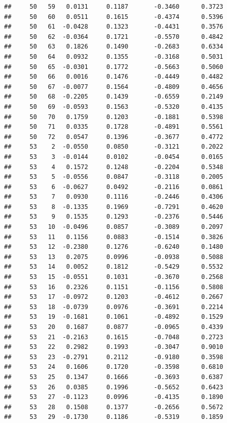 \documentclass[
]{article}
\begin{document}
\begin{verbatim}
##     50   59   0.0131     0.1187       -0.3460      0.3723  
##     50   60   0.0511     0.1615       -0.4374      0.5396  
##     50   61  -0.0428     0.1323       -0.4431      0.3576  
##     50   62  -0.0364     0.1721       -0.5570      0.4842  
##     50   63   0.1826     0.1490       -0.2683      0.6334  
##     50   64   0.0932     0.1355       -0.3168      0.5031  
##     50   65  -0.0301     0.1772       -0.5663      0.5060  
##     50   66   0.0016     0.1476       -0.4449      0.4482  
##     50   67  -0.0077     0.1564       -0.4809      0.4656  
##     50   68  -0.2205     0.1439       -0.6559      0.2149  
##     50   69  -0.0593     0.1563       -0.5320      0.4135  
##     50   70   0.1759     0.1203       -0.1881      0.5398  
##     50   71   0.0335     0.1728       -0.4891      0.5561  
##     50   72   0.0547     0.1396       -0.3677      0.4772  
##     53    2  -0.0550     0.0850       -0.3121      0.2022  
##     53    3  -0.0144     0.0102       -0.0454      0.0165  
##     53    4   0.1572     0.1248       -0.2204      0.5348  
##     53    5  -0.0556     0.0847       -0.3118      0.2005  
##     53    6  -0.0627     0.0492       -0.2116      0.0861  
##     53    7   0.0930     0.1116       -0.2446      0.4306  
##     53    8  -0.1335     0.1969       -0.7291      0.4620  
##     53    9   0.1535     0.1293       -0.2376      0.5446  
##     53   10  -0.0496     0.0857       -0.3089      0.2097  
##     53   11   0.1156     0.0883       -0.1514      0.3826  
##     53   12  -0.2380     0.1276       -0.6240      0.1480  
##     53   13   0.2075     0.0996       -0.0938      0.5088  
##     53   14   0.0052     0.1812       -0.5429      0.5532  
##     53   15  -0.0551     0.1031       -0.3670      0.2568  
##     53   16   0.2326     0.1151       -0.1156      0.5808  
##     53   17  -0.0972     0.1203       -0.4612      0.2667  
##     53   18  -0.0739     0.0976       -0.3691      0.2214  
##     53   19  -0.1681     0.1061       -0.4892      0.1529  
##     53   20   0.1687     0.0877       -0.0965      0.4339  
##     53   21  -0.2163     0.1615       -0.7048      0.2723  
##     53   22   0.2982     0.1993       -0.3047      0.9010  
##     53   23  -0.2791     0.2112       -0.9180      0.3598  
##     53   24   0.1606     0.1720       -0.3598      0.6810  
##     53   25   0.1347     0.1666       -0.3693      0.6387  
##     53   26   0.0385     0.1996       -0.5652      0.6423  
##     53   27  -0.1123     0.0996       -0.4135      0.1890  
##     53   28   0.1508     0.1377       -0.2656      0.5672  
##     53   29  -0.1730     0.1186       -0.5319      0.1859  

\end{verbatim}
\end{document}
